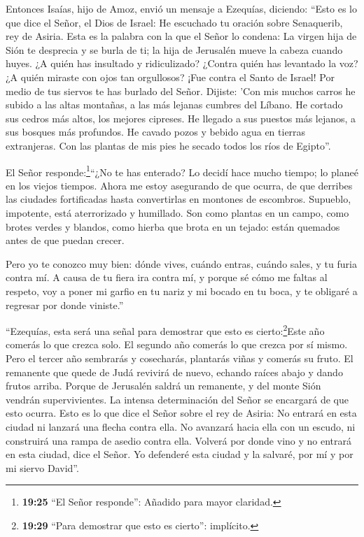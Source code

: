  Entonces Isaías, hijo de Amoz, envió un mensaje a
Ezequías, diciendo: ``Esto es lo que dice el Señor, el Dios de Israel:
He escuchado tu oración sobre Senaquerib, rey de Asiria. 
Esta es la palabra con la que el Señor lo condena: La virgen hija de
Sión te desprecia y se burla de ti; la hija de Jerusalén mueve la cabeza
cuando huyes.  ¿A quién has insultado y ridiculizado?
¿Contra quién has levantado la voz? ¿A quién miraste con ojos tan
orgullosos? ¡Fue contra el Santo de Israel!  Por medio de
tus siervos te has burlado del Señor. Dijiste: 'Con mis muchos carros he
subido a las altas montañas, a las más lejanas cumbres del Líbano. He
cortado sus cedros más altos, los mejores cipreses. He llegado a sus
puestos más lejanos, a sus bosques más profundos.  He
cavado pozos y bebido agua en tierras extranjeras. Con las plantas de
mis pies he secado todos los ríos de Egipto''.

 El Señor responde:\footnote{\textbf{19:25} ``El Señor
  responde'': Añadido para mayor claridad.}``¿No te has enterado? Lo
decidí hace mucho tiempo; lo planeé en los viejos tiempos. Ahora me
estoy asegurando de que ocurra, de que derribes las ciudades
fortificadas hasta convertirlas en montones de escombros. 
Supueblo, impotente, está aterrorizado y humillado. Son como plantas en
un campo, como brotes verdes y blandos, como hierba que brota en un
tejado: están quemados antes de que puedan crecer.

 Pero yo te conozco muy bien: dónde vives, cuándo entras,
cuándo sales, y tu furia contra mí.  A causa de tu fiera
ira contra mí, y porque sé cómo me faltas al respeto, voy a poner mi
garfio en tu nariz y mi bocado en tu boca, y te obligaré a regresar por
donde viniste.''

 ``Ezequías, esta será una señal para demostrar que esto es
cierto:\footnote{\textbf{19:29} ``Para demostrar que esto es cierto'':
  implícito.}Este año comerás lo que crezca solo. El segundo año comerás
lo que crezca por sí mismo. Pero el tercer año sembrarás y cosecharás,
plantarás viñas y comerás su fruto.  El remanente que quede
de Judá revivirá de nuevo, echando raíces abajo y dando frutos arriba.
 Porque de Jerusalén saldrá un remanente, y del monte Sión
vendrán supervivientes. La intensa determinación del Señor se encargará
de que esto ocurra.  Esto es lo que dice el Señor sobre el
rey de Asiria: No entrará en esta ciudad ni lanzará una flecha contra
ella. No avanzará hacia ella con un escudo, ni construirá una rampa de
asedio contra ella.  Volverá por donde vino y no entrará en
esta ciudad, dice el Señor.  Yo defenderé esta ciudad y la
salvaré, por mí y por mi siervo David''.

